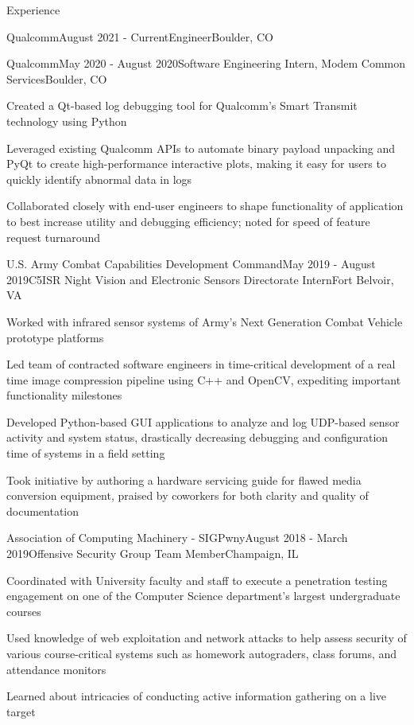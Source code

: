 \documentclass{resume} %
\begin{document}
\begin{rSection}{Experience}

\begin{rSubsection}{Qualcomm}{August 2021 - Current}{Engineer}{Boulder, CO}
\end{rSubsection}

\begin{rSubsection}{Qualcomm}{May 2020 - August 2020}{Software Engineering Intern, Modem Common Services}{Boulder, CO}
\item Created a Qt-based log debugging tool for Qualcomm's Smart Transmit technology using Python
\item Leveraged existing Qualcomm APIs to automate binary payload unpacking and PyQt to create high-performance interactive plots, making it easy for users to quickly identify abnormal data in logs
\item Collaborated closely with end-user engineers to shape functionality of application to best increase utility and debugging efficiency; noted for speed of feature request turnaround
\end{rSubsection}

\begin{rSubsection}{U.S. Army Combat Capabilities Development Command}{May 2019 - August 2019}{C5ISR Night Vision and Electronic Sensors Directorate Intern}{Fort Belvoir, VA}
\item Worked with infrared sensor systems of Army's Next Generation Combat Vehicle prototype platforms 
\item Led team of contracted software engineers in time-critical development of a real time image compression pipeline using C++ and OpenCV, expediting important functionality milestones
\item Developed Python-based GUI applications to analyze and log UDP-based sensor activity and system status, drastically decreasing debugging and configuration time of systems in a field setting
\item Took initiative by authoring a hardware servicing guide for flawed media conversion equipment, praised by coworkers for both clarity and quality of documentation
\end{rSubsection}

\begin{rSubsection}{Association of Computing Machinery - SIGPwny}{August 2018 - March 2019}{Offensive Security Group Team Member}{Champaign, IL}
\item Coordinated with University faculty and staff to execute a penetration testing engagement on one of the Computer Science
department's largest undergraduate courses
\item Used knowledge of web exploitation and network attacks to help assess security of various course-critical
systems such as homework autograders, class forums, and attendance monitors
\item Learned about intricacies of conducting active information gathering on a live target
\end{rSubsection}


\end{rSection}
\end{document}
